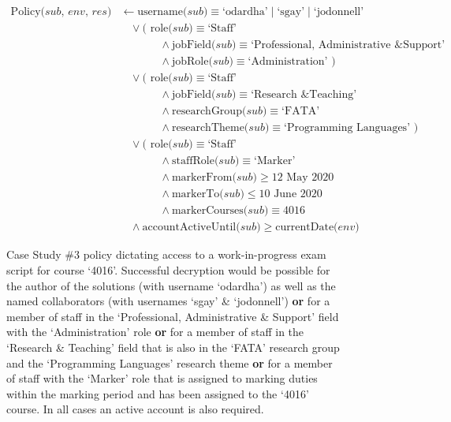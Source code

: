 \begin{figure}[ht]
  \centering
\begin{align*}
  \text{Policy($sub$, $env$, $res$)}
  &
    \leftarrow
    \text{username($sub$)} \equiv \text{`odardha'} \mid \text{`sgay'} \mid \text{`jodonnell'}
  \\
  &
    \phantom{::}\vee
    \text{( role($sub$)} \equiv \text{`Staff'}
  \\
  &
    \phantom{::::::::}\wedge
    \text{jobField($sub$)} \equiv \text{`Professional, Administrative \& Support'}
  \\
  &
    \phantom{::::::::}\wedge
    \text{jobRole($sub$)} \equiv \text{`Administration' )}
  \\
  &
    \phantom{::}\vee
    \text{( role($sub$)} \equiv \text{`Staff'}
  \\
  &
    \phantom{::::::::}\wedge
    \text{jobField($sub$)} \equiv \text{`Research \& Teaching'}
  \\
  &
    \phantom{::::::::}\wedge
    \text{researchGroup($sub$)} \equiv \text{`FATA'}
  \\
  &
    \phantom{::::::::}\wedge
    \text{researchTheme($sub$)} \equiv \text{`Programming Languages' )}
  \\
  &
    \phantom{::}\vee
    \text{( role($sub$)} \equiv \text{`Staff'}
  \\
  &
    \phantom{::::::::}\wedge
    \text{staffRole($sub$)} \equiv \text{`Marker'}
  \\
  &
    \phantom{::::::::}\wedge
    \text{markerFrom($sub$)} \geq \text{12 May 2020}
  \\
  &
    \phantom{::::::::}\wedge
    \text{markerTo($sub$)} \leq \text{10 June 2020}
  \\
  &
    \phantom{::::::::}\wedge
    \text{markerCourses($sub$)} \equiv \text{4016}
  \\
  &
    \phantom{::}\wedge
    \text{accountActiveUntil($sub$)} \geq \text{currentDate($env$)}
\end{align*}
  \caption{
    \label{fig:case_study_policy_3}
    Case Study \#3 policy dictating access to a work-in-progress exam script for course `4016'.
    Successful decryption would be possible for the author of the solutions (with username `odardha') as well as the named collaborators (with usernames `sgay' \& `jodonnell') \textbf{or} for a member of staff in the `Professional, Administrative \& Support' field with the `Administration' role \textbf{or} for a member of staff in the `Research \& Teaching' field that is also in the `FATA' research group and the `Programming Languages' research theme \textbf{or} for a member of staff with the `Marker' role that is assigned to marking duties within the marking period and has been assigned to the `4016' course. In all cases an active account is also required.
  }
\end{figure}
